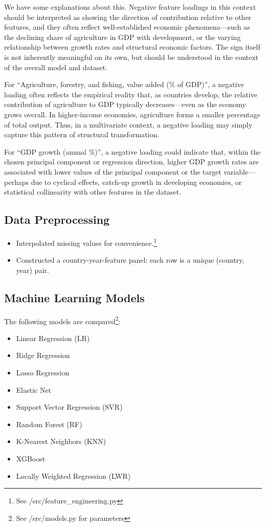 \documentclass[12pt]{article}
\begin{document}
We have some explanations about this. Negative feature loadings in this context should be interpreted as showing the direction of contribution relative to other features, and they often reflect well-established economic phenomena—such as the declining share of agriculture in GDP with development, or the varying relationship between growth rates and structural economic factors.
The sign itself is not inherently meaningful on its own, but should be understood in the context of the overall model and dataset.

For “Agriculture, forestry, and fishing, value added (\% of GDP)”, a negative loading often reflects the empirical reality that, as countries develop, the relative contribution of agriculture to GDP typically decreases—even as the economy grows overall. In higher-income economies, agriculture forms a smaller percentage of total output. Thus, in a multivariate context, a negative loading may simply capture this pattern of structural transformation.

For “GDP growth (annual \%)”, a negative loading could indicate that, within the chosen principal component or regression direction, higher GDP growth rates are associated with lower values of the principal component or the target variable—perhaps due to cyclical effects, catch-up growth in developing economies, or statistical collinearity with other features in the dataset.

\subsection{Data Preprocessing}

\begin{itemize}
    \item Interpolated missing values for convenience.\footnote{See /src/feature\_engineering.py}
    \item Constructed a country-year-feature panel: each row is a unique (country, year) pair.
\end{itemize}



\subsection{Machine Learning Models}

The following models are compared\footnote{See /src/models.py for parameters}:
\begin{itemize}
    \item Linear Regression (LR)
    \item Ridge Regression
    \item Lasso Regression
    \item Elastic Net
    \item Support Vector Regression (SVR)
    \item Random Forest (RF)
    \item K-Nearest Neighbors (KNN)
    \item XGBoost
    \item Locally Weighted Regression (LWR)
\end{itemize}
\end{document}
